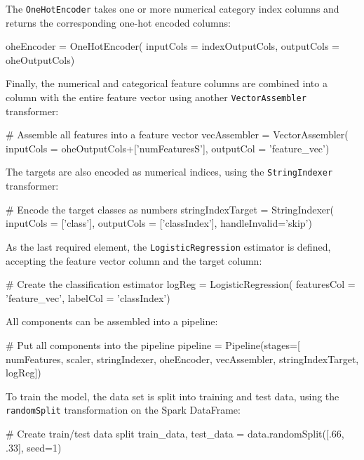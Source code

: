\begin{withcode}
The \texttt{OneHotEncoder} takes one or more numerical category index columns and returns the corresponding one-hot encoded columns:

\begin{pythoncode}
oheEncoder = OneHotEncoder(
    inputCols = indexOutputCols,
    outputCols = oheOutputCols)
\end{pythoncode}

Finally, the numerical and categorical feature columns are combined into a column with the entire feature vector using another \texttt{VectorAssembler} transformer:

\begin{pythoncode}
# Assemble all features into a feature vector
vecAssembler = VectorAssembler(
    inputCols = oheOutputCols+['numFeaturesS'],
    outputCol = 'feature_vec')
\end{pythoncode}

The targets are also encoded as numerical indices, using the \texttt{StringIndexer} transformer:

\begin{pythoncode}
# Encode the target classes as numbers
stringIndexTarget = StringIndexer(
    inputCols = ['class'],
    outputCols = ['classIndex'],
    handleInvalid='skip')
\end{pythoncode}    

As the last required element, the \texttt{LogisticRegression} estimator is defined, accepting the feature vector column and the target column:

\begin{pythoncode}
# Create the classification estimator
logReg = LogisticRegression(
    featuresCol = 'feature_vec', labelCol = 'classIndex')
\end{pythoncode}
All components can be assembled into a pipeline:

\begin{pythoncode}
# Put all components into the pipeline
pipeline = Pipeline(stages=[
    numFeatures,
    scaler,
    stringIndexer,
    oheEncoder,
    vecAssembler,
    stringIndexTarget,
    logReg])
\end{pythoncode}

To train the model, the data set is split into training and test data, using the \texttt{randomSplit} transformation on the Spark DataFrame:

\begin{pythoncode}
# Create train/test data split
train_data, test_data = data.randomSplit([.66, .33], seed=1)
\end{pythoncode}


\end{withcode}
